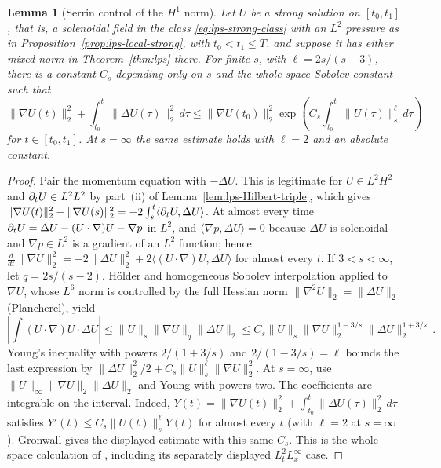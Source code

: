 \documentclass[11pt,letterpaper]{article}
\numberwithin{equation}{section}
\theoremstyle{plain}
\newtheorem{lemma}[theorem]{Lemma}
\theoremstyle{definition}
\theoremstyle{remark}
\begin{document}
\begin{lemma}[Serrin control of the $H^1$ norm]\label{lem:lps-H1-estimate}
Let $U$ be a strong solution on $[t_0,t_1]$, that is, a solenoidal
field in the class \eqref{eq:lps-strong-class} with an $L^2$ pressure as in
Proposition~\ref{prop:lps-local-strong}, with
$t_0<t_1\le T$, and suppose it has either mixed norm in
Theorem~\ref{thm:lps} there. For finite $s$, with
$\ell=2s/(s-3)$, there is a constant $C_s$ depending only on $s$ and
the whole-space Sobolev constant such that
\begin{equation}\label{eq:lps-H1-gronwall}
\|\nabla U(t)\|_2^2+
\int_{t_0}^{t}\|\Delta U(\tau)\|_2^2\,d\tau
\le\|\nabla U(t_0)\|_2^2
\exp\left(C_s\int_{t_0}^{t}\|U(\tau)\|_s^\ell\,d\tau\right)
\end{equation}
for $t\in[t_0,t_1]$. At $s=\infty$ the same estimate holds with
$\ell=2$ and an absolute constant.
\end{lemma}

\begin{proof}
Pair the momentum equation with $-\Delta U$. This is legitimate for
$U\in L^2H^2$ and $\partial_t U\in L^2L^2$ by part~(ii) of
Lemma~\ref{lem:lps-Hilbert-triple}, which gives
$\|\nabla U(t)\|_2^2-\|\nabla U(s)\|_2^2=-2\int_s^t\langle\partial_t U,\Delta U\rangle$.
At almost every time $\partial_t U=\Delta U-(U\cdot\nabla)U-\nabla p$ in $L^2$, and
$\langle\nabla p,\Delta U\rangle=0$ because $\Delta U$ is solenoidal and
$\nabla p\in L^2$ is a gradient of an $L^2$ function; hence
$\frac{d}{dt}\|\nabla U\|_2^2=-2\|\Delta U\|_2^2
+2\langle(U\cdot\nabla)U,\Delta U\rangle$ for almost every $t$. If
$3<s<\infty$, let $q=2s/(s-2)$. H\"older and homogeneous Sobolev
interpolation applied to $\nabla U$, whose $L^6$ norm is controlled by the
full Hessian norm $\|\nabla^2U\|_2=\|\Delta U\|_2$ (Plancherel), yield
\begin{equation}\label{eq:lps-H1-nonlinear}
\left|\int(U\cdot\nabla)U\cdot\Delta U\right|
\le\|U\|_s\|\nabla U\|_q\|\Delta U\|_2
\le C_s\|U\|_s\|\nabla U\|_2^{1-3/s}
             \|\Delta U\|_2^{1+3/s}\,.
\end{equation}
Young's inequality with powers $2/(1+3/s)$ and
$2/(1-3/s)=\ell$ bounds the last expression by
$\|\Delta U\|_2^2/2+C_s\|U\|_s^\ell\|\nabla U\|_2^2$.
At $s=\infty$, use
$\|U\|_\infty\|\nabla U\|_2\|\Delta U\|_2$
and Young with powers two. The coefficients are integrable on the
interval. Indeed,
$Y(t)=\|\nabla U(t)\|_2^2+
\int_{t_0}^t\|\Delta U(\tau)\|_2^2\,d\tau$
satisfies $Y'(t)\le C_s\|U(t)\|_s^\ell Y(t)$ for almost every $t$
(with $\ell=2$ at $s=\infty$). Gronwall gives the displayed
estimate with this same $C_s$. This is the whole-space calculation of
\cite[Lemma~8.16, printed pp.~171--172]{RobinsonRodrigoSadowski2016},
including its separately displayed $L^2_tL^\infty_x$ case.
\end{proof}
\end{document}
